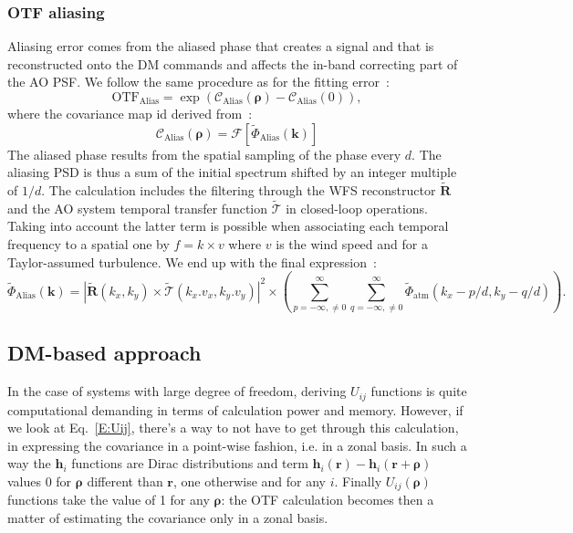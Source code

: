 \documentclass[12pt]{article}
\newcommand{\module}[1]{\left\vert #1 \right\vert}
\newcommand{\para}[1]{\left(#1\right)}
\newcommand{\cro}[1]{\left[#1\right]}
\newcommand{\R}{\boldsymbol{\text{R}}}
\newcommand{\rbb}{\boldsymbol{r}}
\newcommand{\rhob}{\boldsymbol{\rho}}
\newcommand{\otf}[1]{\text{OTF}_{#1}}
\newcommand{\hi}{\boldsymbol{h}_i}
\begin{document}
\subsubsection{OTF aliasing}
Aliasing error comes from the aliased phase that creates a signal and that is reconstructed onto the DM commands and affects the in-band correcting part of the AO PSF. We follow the same procedure as for the fitting error~:
\begin{equation}
\otf{\text{Alias}} = \exp(\mathcal{C}_{\text{Alias}}(\rhob) - \mathcal{C}_{\text{Alias}}(0) ),
\end{equation}
where the covariance map id derived from~:
\begin{equation} \label{E:covalias}
\mathcal{C}_{\text{Alias}}(\rhob) = \mathcal{F}\cro{\tilde{\Phi}_\text{Alias}(\boldsymbol{k})}
\end{equation}
The aliased phase results from the spatial sampling of the phase every $d$. The aliasing PSD is thus a sum of the initial spectrum shifted by an integer multiple of $1/d$. The calculation includes the filtering through the WFS reconstructor $\tilde{\R}$ and the AO system temporal transfer function $\tilde{\mathcal{T}}$ in closed-loop operations. Taking into account the latter term is possible when associating each temporal frequency to a spatial one by $f=k\times v$ where $v$ is the wind speed and for a Taylor-assumed turbulence. We end up with the final expression~:
\begin{equation}
\tilde{\Phi}_\text{Alias}(\boldsymbol{k}) = \module{\tilde{\R}(k_x,k_y)\times\tilde{\mathcal{T}}(k_x.v_x,k_y.v_y)}^2\times\para{\sum_{p=-\infty,\neq 0}^{\infty} \sum_{q=-\infty,\neq 0}^{\infty}\tilde{\Phi}_\text{atm}(k_x - p/d,k_y-q/d)}.
\end{equation}

\subsection{DM-based approach}

In the case of systems with large degree of freedom, deriving $U_{ij}$ functions is quite computational demanding in terms of calculation power and memory. However, if we look at Eq.~\ref{E:Uij}, there's a way to not have to get through this calculation, in expressing the covariance in a point-wise fashion, i.e. in a zonal basis. In such a way the $\hi$ functions are Dirac distributions and term $\hi(\rbb) - \hi(\rbb+\rhob)$ values 0 for $\rhob$ different than $\rbb$, one otherwise and for any $i$. Finally $U_{ij}(\rhob)$ functions take the value of 1 for any $\rhob$: the OTF calculation becomes then a matter of estimating the covariance only in a zonal basis.\\
\end{document}
